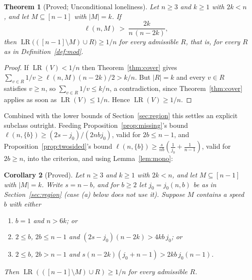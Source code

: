 \documentclass[11pt]{amsart}
\theoremstyle{plain}
\newtheorem{theorem}{Theorem}[section]
\newtheorem{corollary}[theorem]{Corollary}
\theoremstyle{definition}
\newcommand{\LR}{\operatorname{LR}}
\begin{document}
\begin{theorem}[Proved; Unconditional loneliness]\label{thm:uncond}
Let $n\ge3$ and $k\ge1$ with $2k<n$, and let $M\subseteq[n-1]$ with $|M|=k$. If
\[
  \ell(n,M)\ >\ \frac{2k}{n\,(n-2k)},
\]
then $\LR\bigl(([n-1]\setminus M)\cup R\bigr)\ge 1/n$ for \emph{every} admissible $R$, that is, for
every $R$ as in Definition~\ref{def:mod}.
\end{theorem}

\begin{proof}
If $\LR(V)<1/n$ then Theorem~\ref{thm:cover} gives
$\sum_{v\in R}1/v\ge\ell(n,M)(n-2k)/2>k/n$. But $|R|=k$ and every $v\in R$ satisfies $v\ge n$, so
$\sum_{v\in R}1/v\le k/n$, a contradiction, since Theorem~\ref{thm:cover} applies as soon as $\LR(V)\le1/n$. Hence
$\LR(V)\ge1/n$.
\end{proof}

Combined with the lower bounds of Section~\ref{sec:region} this settles an explicit subclass
outright. Feeding Proposition~\ref{prop:missing}'s bound $\ell(n,\{b\})\ge(2s-j_0)/(2nbj_0)$, valid
for $2b\le n-1$, and Proposition~\ref{prop:twosided}'s bound
$\ell(n,\{b\})\ge\frac{s}{nb}(\frac1{j_0}+\frac1{n-1})$, valid for $2b\ge n$, into the criterion, and
using Lemma~\ref{lem:mono}:

\begin{corollary}[Proved]\label{cor:uncond}
Let $n\ge3$ and $k\ge1$ with $2k<n$, and let $M\subseteq[n-1]$ with $|M|=k$. Write $s=n-b$, and for $b\ge2$ let $j_0=j_0(n,b)$ be as in Section~\ref{sec:region} (case (a)
below does not use it). Suppose $M$ contains a speed $b$ with either
\begin{enumerate}
\item[(a)] $b=1$ and $n>6k$; or
\item[(b)] $2\le b$, $2b\le n-1$ and $(2s-j_0)(n-2k)>4kb\,j_0$; or
\item[(c)] $2\le b$, $2b>n-1$ and $s(n-2k)(j_0+n-1)>2kb\,j_0(n-1)$.
\end{enumerate}
Then $\LR(([n-1]\setminus M)\cup R)\ge1/n$ for every admissible $R$.
\end{corollary}
\end{document}
